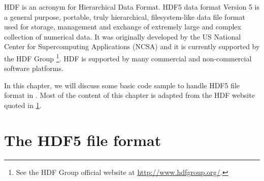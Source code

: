 


HDF is an acronym for Hierarchical Data Format.
HDF5 data format Version 5 is a general purpose, portable, truly hierarchical,
filesystem-like data file format used for storage, management
and exchange of extremely large and complex collection of numerical data.
It was originally developed by the US National Center for Supercomputing Applications
(NCSA) and it is currently supported by the HDF Group%
\footnote{\label{footnote:HDF5}See the HDF Group official website at \url{http://www.hdfgroup.org/}.}.
HDF is supported by many commercial and non-commercial software platforms.

In this chapter, we will discuss some basic code sample to handle HDF5 file
format in \cpp{}.
Most of the content of this chapter is adapted from the HDF website quoted in
\cref{footnote:HDF5}.

\section{The HDF5 file format}




